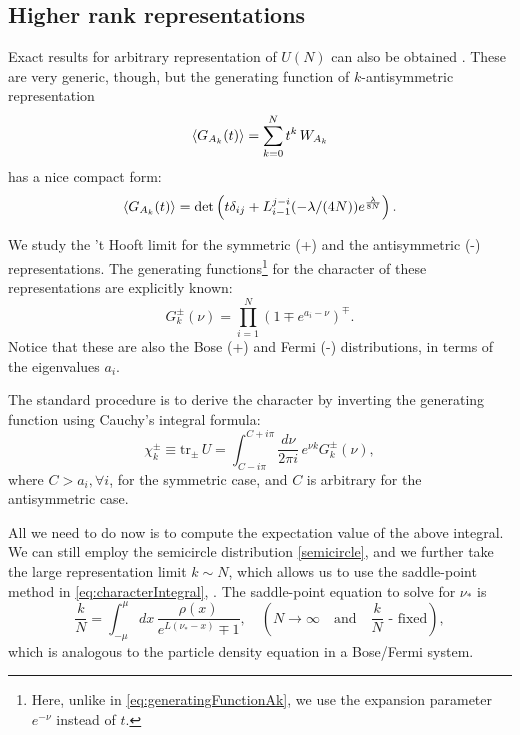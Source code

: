 

\subsection{Higher rank representations}

Exact results for arbitrary representation of $U(N)$ can also be obtained \cite{Fiol:2013hna}.
These are very generic, though, 
but the generating function of $k$-antisymmetric representation 
\begin{equation}\label{eq:generatingFunctionAk}
 \braket{G_{A_k}(t)}=\sum_{k=0}^{N} t^k \, W_{A_k}
\end{equation}
has a nice compact form:
\begin{equation}
 \braket{G_{A_k}(t)}=\text{det}\left(t \delta_{ij}+ L_{i-1}^{j-i}(-\lambda/(4N)) e^{\frac{\lambda}{8N}}\right).
\end{equation}

We study the 't Hooft limit
for the symmetric (+) and the antisymmetric (-) representations. 
The generating functions\footnote{
Here, unlike in \eqref{eq:generatingFunctionAk}, 
we use the expansion parameter $e^{-\nu}$ instead of $t$.}
for the character of these representations are explicitly known:
\begin{equation}
 G_k^{\pm}(\nu) = \prod_{i=1}^N (1\mp e^{a_i - \nu})^{\mp}.
\end{equation}
Notice that these are also the Bose (+) and Fermi (-) distributions, in terms of the eigenvalues $a_i$.

The standard procedure is to derive the character by inverting the generating function using Cauchy's integral formula:
\begin{equation}\label{eq:characterIntegral}
 \chi_k^\pm \equiv \text{tr}_\pm \,U = \int_{C-i\pi}^{C+i\pi} \dfrac{d\nu}{2\pi i} \, e^{\nu k} G_k^\pm(\nu),
\end{equation}
where $C>a_i, \forall i$, for the symmetric case, and $C$ is arbitrary for the antisymmetric case.


All we need to do now is to compute the expectation value of the above integral. 
We can still employ the semicircle distribution \eqref{semicircle}, 
and we further take the large representation limit $k \sim N$,
which allows us to use the saddle-point method in \eqref{eq:characterIntegral}, \cite{Hartnoll:2006is}.
The saddle-point equation to solve for $\nu_*$ is
\begin{equation}\label{eq:saddlePointDensity}
 \dfrac{k}{N} = \int_{-\mu}^\mu dx \, \dfrac{\rho(x)}{e^{L(\nu_*-x)}\mp 1}, 
 \quad (N\rightarrow \infty \quad \text{and} \quad \frac{k}{N} \text{ - fixed}),
\end{equation}
which is analogous to the particle density equation in a Bose/Fermi system.

